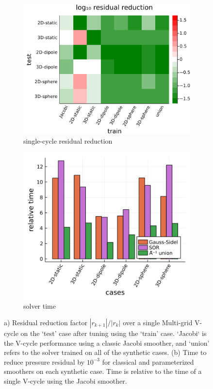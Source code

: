\documentclass[review]{elsarticle}
\begin{document}
\begin{figure}
    \centering
    \begin{subfigure}[b]{0.47\textwidth}
        \centering
        \includegraphics[width=\textwidth]{figures/crossloss.png}
        \caption{single-cycle residual reduction}
        \label{fig:cross plot}
    \end{subfigure}
    \hfill
    \begin{subfigure}[b]{0.47\textwidth}
        \centering
        \includegraphics[width=\textwidth]{figures/synthetic_timing.png}
        \caption{solver time}
        \label{fig:synthetic time}
    \end{subfigure}
    \caption{a) Residual reduction factor $|r_{k+1}|/|r_k|$ over a single Multi-grid V-cycle on the `test' case after tuning using the `train' case. `Jacobi` is the V-cycle performance using a classic Jacobi smoother, and `union' refers to the solver trained on all of the synthetic cases. (b) Time to reduce pressure residual by $10^{-3}$ for classical and parameterized smoothers on each synthetic case. Time is relative to the time of a single V-cycle using the Jacobi smoother.}
    \label{fig:synthetic results}
\end{figure}
\end{document}

